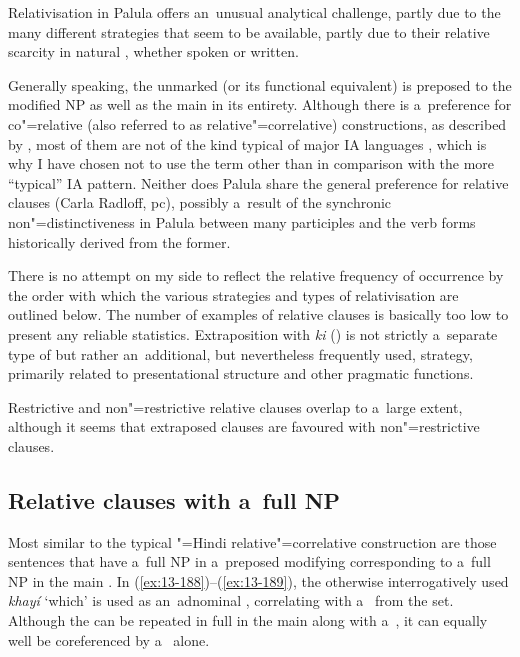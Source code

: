 Relativisation in Palula offers an~unusual analytical challenge, partly due to the many different strategies that seem to be available, partly due to their relative scarcity in natural , whether spoken or written. 



Generally speaking, the unmarked  (or its functional equivalent) is preposed to the modified NP as well as the main  in its entirety. Although there is a~preference for co"=relative (also referred to as relative"=correlative) constructions, as described by \citet{downing1974}, most of them are not of the kind typical of major IA languages \citep[410--415]{masica1991}, which is why I have chosen not to use the term other than in comparison with the more ``typical'' IA pattern. Neither does Palula share the general  preference for  relative clauses (Carla Radloff, pc), possibly a~result of the synchronic non"=distinctiveness in Palula between many participles and the  verb forms historically derived from the former.



There is no attempt on my side to reflect the relative frequency of occurrence by the order with which the various strategies and types of relativisation are outlined below. The number of examples of relative clauses is basically too low to present any reliable statistics. Extraposition with \textit{ki} () is not strictly a~separate type of  but rather an~additional, but nevertheless frequently used, strategy, primarily related to presentational structure and other pragmatic functions.



Restrictive and non"=restrictive relative clauses overlap to a~large extent, although it seems that extraposed clauses are favoured with non"=restrictive clauses.


\subsection{Relative clauses with a~full NP}
\label{subsec:13-6-1}


Most similar to the typical "=Hindi relative"=correlative construction are those sentences that have a~full NP in a~preposed modifying  corresponding to a~full NP in the main . In (\ref{ex:13-188})--(\ref{ex:13-189}), the otherwise interrogatively used \textit{khayí} `which' is used as an~adnominal , correlating with a~ from the  set. Although the  can be repeated in full in the main  along with a~, it can equally well be coreferenced by a~ alone.



